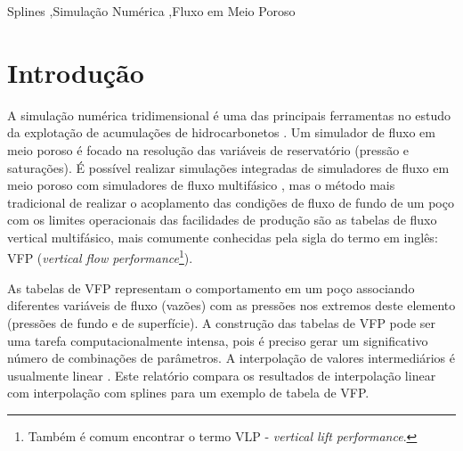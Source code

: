 \documentclass[final,5p]{elsarticle}
\numberwithin{equation}{section}
\begin{document}
\begin{frontmatter}

\begin{keyword}
    Splines \sep Simulação Numérica \sep Fluxo em Meio Poroso



\end{keyword}

\end{frontmatter}


\section{Introdução}

    A simulação numérica tridimensional é uma das principais ferramentas no estudo da explotação de acumulações de hidrocarbonetos \cite{ReservoirSimulationErtekin}. Um simulador de fluxo em meio poroso é focado na resolução das variáveis de reservatório (pressão e saturações). É possível realizar simulações integradas de simuladores de fluxo em meio poroso com simuladores de fluxo multifásico \cite{10.2118/195477-MS}, mas o método mais tradicional de realizar o acoplamento das condições de fluxo de fundo de um poço com os limites operacionais das facilidades de produção são as tabelas de fluxo vertical multifásico, mais comumente conhecidas pela sigla do termo em inglês: VFP (\emph{vertical flow performance}\footnote{Também é comum encontrar o termo VLP - \emph{vertical lift performance}.}).

    As tabelas de VFP representam o comportamento em um poço associando diferentes variáveis de fluxo (vazões) com as pressões nos extremos deste elemento (pressões de fundo e de superfície). A construção das tabelas de VFP pode ser uma tarefa computacionalmente intensa, pois é preciso gerar um significativo número de combinações de parâmetros. A interpolação de valores intermediários é usualmente linear \cite{computer2022cmg}\cite{schlumberger2009technical}. Este relatório compara os resultados de interpolação linear com interpolação com splines para um exemplo de tabela de VFP.
\end{document}
